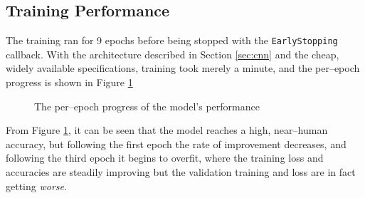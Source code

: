 \documentclass[conference]{IEEEtran}
\begin{document}
\subsection{Training Performance}
The training ran for 9 epochs before being stopped with the \verb|EarlyStopping| callback. With the architecture described in Section \ref{sec:cnn} and the cheap, widely available specifications, training took merely a minute, and the per--epoch progress is shown in Figure \ref{fig:perepoch}
\begin{figure}[!htp]
    \centering
    \scriptsize
    \caption{The per--epoch progress of the model's performance }\label{fig:perepoch}
\end{figure}
\par From Figure \ref{fig:perepoch}, it can be seen that the model reaches a high, near--human accuracy, but following the first epoch the rate of improvement decreases, and following the third epoch it begins to overfit, where the training loss and accuracies are steadily improving but the validation training and loss are in fact getting \textit{worse}.
\end{document}
